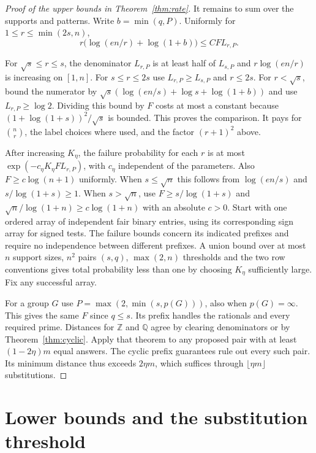 \documentclass[11pt,letterpaper]{article}
\numberwithin{equation}{section}
\begin{document}
\begin{proof}[Proof of the upper bounds in Theorem~\ref{thm:rate}]
It remains to sum over the supports and patterns. Write $b=\min(q,P)$. Uniformly for $1\le r\le\min(2s,n)$,
\[
r\bigl(\log(en/r)+\log(1+b)\bigr)
\le C F L_{r,P}.
\]

For $\sqrt s\le r\le s$, the denominator $L_{r,P}$ is at least half of $L_{s,P}$ and
$r\log(en/r)$ is increasing on $[1,n]$. For $s\le r\le 2s$ use $L_{r,P}\ge L_{s,P}$ and
$r\le2s$. For $r<\sqrt s$, bound the numerator by $\sqrt s(\log(en/s)+\log s+\log(1+b))$ and
use $L_{r,P}\ge\log2$. Dividing this bound by $F$ costs at most a constant because
$(1+\log(1+s))^2/\sqrt s$ is bounded. This proves the comparison. It pays for $\binom nr$, the
label choices where used, and the factor $(r+1)^2$ above.

After increasing $K_\eta$, the failure probability for each $r$ is at most $\exp(-c_\eta
K_\eta F L_{r,P})$, with $c_\eta$ independent of the parameters. Also $F\ge c\log(n+1)$
uniformly. When $s\le\sqrt n$ this follows from $\log(en/s)$ and $s/\log(1+s)\ge1$. When
$s>\sqrt n$, use $F\ge s/\log(1+s)$ and $\sqrt n/\log(1+n)\ge c\log(1+n)$ with an absolute
$c>0$. Start with one ordered array of independent fair binary entries, using its
corresponding sign array for signed tests. The failure bounds concern its indicated prefixes
and require no independence between different prefixes. A union bound over at most $n$ support
sizes, $n^2$ pairs $(s,q)$, $\max(2,n)$ thresholds and the two row conventions gives total
probability less than one by choosing $K_\eta$ sufficiently large. Fix any successful array.

For a group $G$ use $P=\max(2,\min(s,p(G)))$, also when $p(G)=\infty$. This gives the same $F$
since $q\le s$. Its prefix handles the rationals and every required prime. Distances for
$\mathbb Z$ and $\mathbb Q$ agree by clearing denominators or by Theorem~\ref{thm:cyclic}.
Apply that theorem to any proposed pair with at least $(1-2\eta)m$ equal answers. The cyclic
prefix guarantees rule out every such pair. Its minimum distance thus exceeds $2\eta m$, which
suffices through $\lfloor\eta m\rfloor$ substitutions.
\end{proof}

\section{Lower bounds and the substitution threshold}\label{sec:lower}
\end{document}
